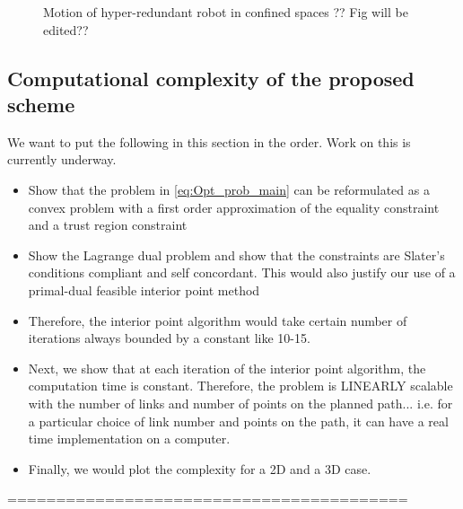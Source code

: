 \documentclass[12pt,a4]{article}
\begin{document}
\begin{figure}[ht!]
\begin{subfigure}{0.3\textwidth}
    \end{subfigure}
    \caption{ Motion of hyper-redundant robot in confined spaces ?? Fig will be edited??}
\end{figure}

\subsection{Computational complexity of the proposed scheme}

We want to put the following in this section in the order. Work on this is currently underway.
\begin{itemize}
	\item Show that the problem in \cref{eq:Opt_prob_main} can be reformulated as a convex problem with a first order approximation of the equality constraint and a trust region constraint
	\item Show the Lagrange dual problem and show that the constraints are Slater's conditions compliant and self concordant. This would also justify our use of a primal-dual feasible interior point method
	\item  Therefore, the interior point algorithm would take certain number of iterations always bounded by a constant like 10-15.
	\item Next, we show that at each iteration of the interior point algorithm, the computation time is constant. Therefore, the problem is LINEARLY scalable with the number of links and number of points on the planned path... i.e. for a particular choice of link number and points on the path, it can have a real time implementation on a computer.
	\item Finally, we would plot the complexity for a 2D and a 3D case. 
\end{itemize}
=========================================\\
\end{document}

